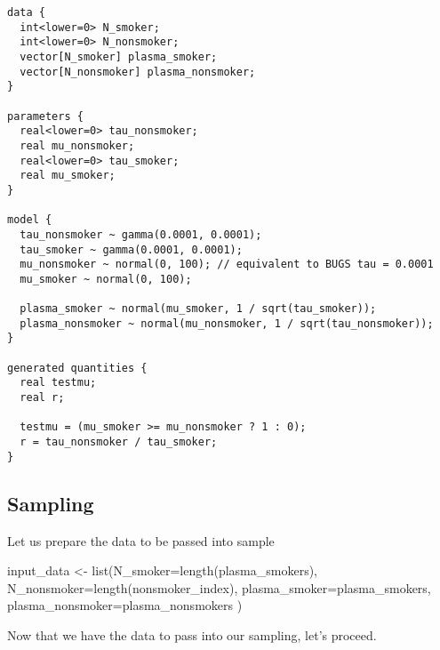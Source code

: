 \documentclass[
  letterpaper,
  DIV=11,
  numbers=noendperiod]{scrreprt}
\newenvironment{Shaded}{\begin{snugshade}}{\end{snugshade}}
\newcommand{\AttributeTok}[1]{\textcolor[rgb]{0.40,0.45,0.13}{#1}}
\newcommand{\CommentTok}[1]{\textcolor[rgb]{0.37,0.37,0.37}{#1}}
\newcommand{\DecValTok}[1]{\textcolor[rgb]{0.68,0.00,0.00}{#1}}
\newcommand{\FunctionTok}[1]{\textcolor[rgb]{0.28,0.35,0.67}{#1}}
\newcommand{\NormalTok}[1]{\textcolor[rgb]{0.00,0.23,0.31}{#1}}
\newcommand{\OtherTok}[1]{\textcolor[rgb]{0.00,0.23,0.31}{#1}}
\newcommand{\SpecialCharTok}[1]{\textcolor[rgb]{0.37,0.37,0.37}{#1}}
\begin{document}
\begin{verbatim}
data {
  int<lower=0> N_smoker;
  int<lower=0> N_nonsmoker;
  vector[N_smoker] plasma_smoker;
  vector[N_nonsmoker] plasma_nonsmoker;
}

parameters {
  real<lower=0> tau_nonsmoker;
  real mu_nonsmoker;
  real<lower=0> tau_smoker;
  real mu_smoker;
}

model {
  tau_nonsmoker ~ gamma(0.0001, 0.0001);
  tau_smoker ~ gamma(0.0001, 0.0001);
  mu_nonsmoker ~ normal(0, 100); // equivalent to BUGS tau = 0.0001
  mu_smoker ~ normal(0, 100);
  
  plasma_smoker ~ normal(mu_smoker, 1 / sqrt(tau_smoker));
  plasma_nonsmoker ~ normal(mu_nonsmoker, 1 / sqrt(tau_nonsmoker));
}

generated quantities {
  real testmu;
  real r;
  
  testmu = (mu_smoker >= mu_nonsmoker ? 1 : 0);
  r = tau_nonsmoker / tau_smoker;
}
\end{verbatim}

\hypertarget{sampling}{%
\subsection*{Sampling}\label{sampling}}

Let us prepare the data to be passed into sample

\begin{Shaded}
\begin{Highlighting}[]
\NormalTok{input\_data }\OtherTok{\textless{}{-}} \FunctionTok{list}\NormalTok{(}\AttributeTok{N\_smoker=}\FunctionTok{length}\NormalTok{(plasma\_smokers), }
                   \AttributeTok{N\_nonsmoker=}\FunctionTok{length}\NormalTok{(nonsmoker\_index),}
                   \AttributeTok{plasma\_smoker=}\NormalTok{plasma\_smokers,}
                   \AttributeTok{plasma\_nonsmoker=}\NormalTok{plasma\_nonsmokers}
\NormalTok{)}
\end{Highlighting}
\end{Shaded}

Now that we have the data to pass into our sampling, let's proceed.

\begin{Shaded}
\end{Shaded}
\end{document}
